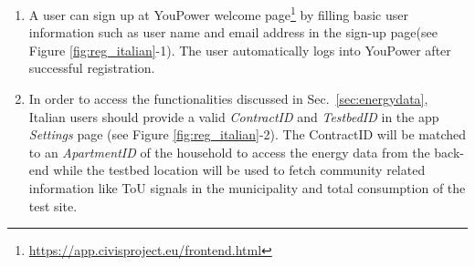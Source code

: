 \begin{enumerate}

\item A user can sign up at YouPower welcome page\footnote{\url{https://app.civisproject.eu/frontend.html}} by filling basic user information such as user name and email address in the sign-up page(see Figure \ref{fig:reg_italian}-1). The user automatically logs into YouPower after successful registration.

\item In order to access the functionalities discussed in Sec.~\ref{sec:energydata}, Italian users should provide a valid \textit{ContractID} and \textit{TestbedID} in the app \textit{Settings} page (see Figure \ref{fig:reg_italian}-2). The ContractID will be matched to an \textit{ApartmentID} of the household to access the energy data from the back-end while the testbed location will be used to fetch community related information like ToU signals in the municipality and total consumption of the test site. 
\begin{figure}
      \begin{center}
        \begin{minipage}[htb]{0.45\linewidth}    

\end{minipage}
\end{center}
\end{figure}
\end{enumerate}
